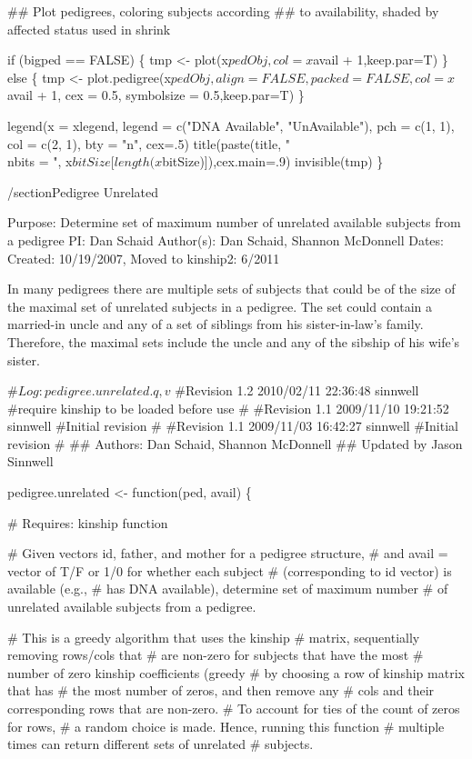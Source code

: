 \documentclass{article}
\begin{document}
\begin{enumerate}
  ##  Plot pedigrees, coloring subjects according
  ##   to availability, shaded by affected status used in shrink

  if (bigped == FALSE) \{
    tmp <- plot(x$pedObj, col = x$avail + 1,keep.par=T)
  \}
  else \{
    tmp <- plot.pedigree(x$pedObj, align = FALSE, packed = FALSE, 
                col = x$avail + 1, cex = 0.5, symbolsize = 0.5,keep.par=T)
  \}
  
  legend(x = xlegend, legend = c("DNA Available", "UnAvailable"), 
         pch = c(1, 1), col = c(2, 1), bty = "n", cex=.5)
  title(paste(title, "\\nbits = ", x$bitSize[length(x$bitSize)]),cex.main=.9)
  invisible(tmp)
\} 

\nwendcode{}\nwdocspar


/section{Pedigree Unrelated}

Purpose: Determine set of maximum number of unrelated
         available subjects from a pedigree
PI:      Dan Schaid
Author(s): Dan Schaid, Shannon McDonnell
Dates:   Created: 10/19/2007, Moved to kinship2: 6/2011

In many pedigrees there are multiple sets of subjects that could be of the 
size of the maximal set of unrelated subjects in a pedigree.  The set could
contain a married-in uncle and any of a set of siblings from his 
sister-in-law's family.  Therefore, the maximal sets include the uncle and 
any of the sibship of his wife's sister.

\nwenddocs{}\endmoddef


#$Log: pedigree.unrelated.q,v $
#Revision 1.2  2010/02/11 22:36:48  sinnwell
#require kinship to be loaded before use
#
#Revision 1.1  2009/11/10 19:21:52  sinnwell
#Initial revision
#
#Revision 1.1  2009/11/03 16:42:27  sinnwell
#Initial revision
#
## Authors: Dan Schaid, Shannon McDonnell
## Updated by Jason Sinnwell

pedigree.unrelated <- function(ped, avail) \{
  
  # Requires: kinship function

  # Given vectors id, father, and mother for a pedigree structure,
  # and avail = vector of T/F or 1/0 for whether each subject
  # (corresponding to id vector) is available (e.g.,
  # has DNA available), determine set of maximum number
  # of unrelated available subjects from a pedigree.

  # This is a greedy algorithm that uses the kinship
  # matrix, sequentially removing rows/cols that
  # are non-zero for subjects that have the most
  # number of zero kinship coefficients (greedy
  # by choosing a row of kinship matrix that has
  # the most number of zeros, and then remove any
  # cols and their corresponding rows that are non-zero.
  # To account for ties of the count of zeros for rows,
  # a random choice is made. Hence, running this function
  # multiple times can return different sets of unrelated
  # subjects.


\end{enumerate}
\end{document}
